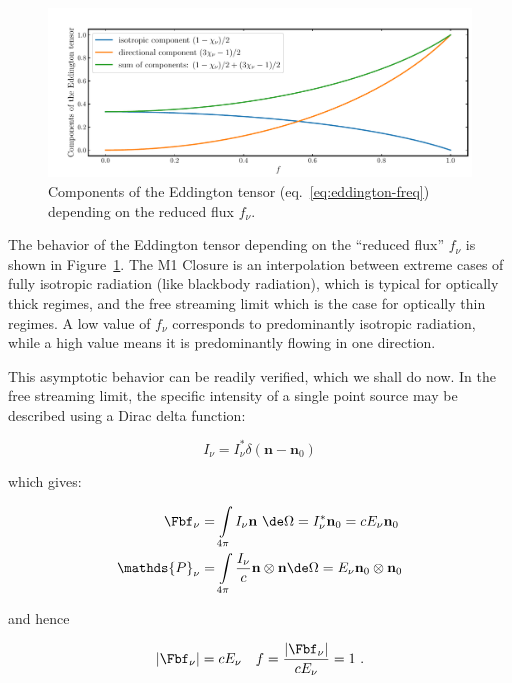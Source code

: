 \begin{figure}
 \centering
 \includegraphics[width=\textwidth]{figures/RHD/chi.pdf}%
 \caption{Components of the Eddington tensor (eq.~\ref{eq:eddington-freq}) depending on the reduced
flux $f_\nu$.}
 \label{fig:eddington-chi}
\end{figure}


The behavior of the Eddington tensor depending on the ``reduced flux'' $f_\nu$ is shown in
Figure~\ref{fig:eddington-chi}. The M1 Closure is an interpolation between extreme cases of fully
isotropic radiation (like blackbody radiation), which is typical for optically thick regimes, and
the free streaming limit which is the case for optically thin regimes. A low value of $f_\nu$
corresponds to predominantly isotropic radiation, while a high value means it is predominantly
flowing in one direction.

This asymptotic behavior can be readily verified, which we shall do now. In the free streaming
limit, the specific intensity of a single point source may be described using a Dirac delta
function:

\begin{equation}
	I_\nu = I_\nu^* \delta(\mathbf{n} - \mathbf{n}_0)
\end{equation}

which gives:

\begin{align}
	\Fbf_\nu &= \int\limits_{4 \pi} I_\nu \mathbf{n} \ \de \Omega = I^*_\nu \mathbf{n}_0 = c E_\nu
\mathbf{n}_0 \\
	\mathds{P}_\nu &= \int\limits_{4 \pi} \frac{I_\nu}{c} \mathbf{n} \otimes \mathbf{n} \de \Omega
=
E_\nu \mathbf{n}_0 \otimes \mathbf{n}_0
\end{align}

and hence

\begin{align}
	|\Fbf_\nu| = c E_\nu && f = \frac{|\Fbf_\nu|}{c E_\nu} = 1 \ .
\end{align}

